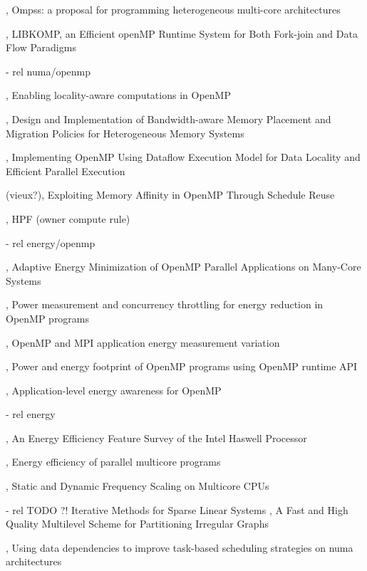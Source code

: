 \cite{OMPSs}, Ompss: a proposal for programming heterogeneous multi-core architectures

\cite{Broquedis2012}, LIBKOMP, an Efficient openMP Runtime System for Both Fork-join and Data Flow Paradigms

  - rel numa/openmp

\cite{Huang2010}, Enabling locality-aware computations in OpenMP

\cite{Yu2017}, Design and Implementation of Bandwidth-aware Memory Placement and Migration Policies for Heterogeneous Memory Systems

\cite{Weng2002}, Implementing OpenMP Using Dataflow Execution Model for Data Locality and Efficient Parallel Execution

(vieux?)\cite{Nikolopoulos2001}, Exploiting Memory Affinity in OpenMP Through Schedule Reuse

\cite{HPF}, HPF (owner compute rule)

  - rel energy/openmp

\cite{Shafik2015}, Adaptive Energy Minimization of OpenMP Parallel Applications on Many-Core Systems

\cite{Porterfield2013}, Power measurement and concurrency throttling for energy reduction in OpenMP programs

\cite{Porterfield2013a}, OpenMP and MPI application energy measurement variation

\cite{Nandamuri2015}, Power and energy footprint of OpenMP programs using OpenMP runtime API

\cite{Alessi2015}, Application-level energy awareness for OpenMP

  - rel energy

\cite{Hackenberg2015}, An Energy Efficiency Feature Survey of the Intel Haswell Processor

\cite{Davidovic2015}, Energy efficiency of parallel multicore programs

\cite{Bao2016}, Static and Dynamic Frequency Scaling on Multicore CPUs

 - rel TODO ?!
\cite{Saad2013} Iterative Methods for Sparse Linear Systems
\cite{Karypis1998}, A Fast and High Quality Multilevel Scheme for Partitioning Irregular Graphs




%
\cite{Virouleau2016b}, Using data dependencies to improve task-based scheduling strategies on numa architectures

